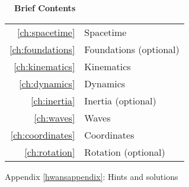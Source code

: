 \documentclass{sr}
\begin{document}


\cleardoublepage





\pagebreak\vspace{100mm}

\hbox{}\noindent\huge\bfseries\sffamily{}\hspace{-2mm}\ \ Brief Contents\\
\hspace{-20mm}\noindent\mynormaltype\Large\sffamily{}\begin{tabular}{rl}
\ref{ch:spacetime} & Spacetime \quad \pageref{ch:spacetime}\\
\ref{ch:foundations} & Foundations (optional) \quad \pageref{ch:foundations}\\
\ref{ch:kinematics} & Kinematics \quad \pageref{ch:kinematics}\\
\ref{ch:dynamics} & Dynamics \quad \pageref{ch:dynamics}\\
\ref{ch:inertia} & Inertia (optional) \quad \pageref{ch:inertia}\\
\ref{ch:waves} & Waves \quad \pageref{ch:waves}\\
\ref{ch:coordinates} & Coordinates \quad \pageref{ch:coordinates}\\
\ref{ch:rotation} & Rotation (optional) \quad \pageref{ch:rotation}\\
\end{tabular}
\mynormaltype

\vspace{100mm}\pagebreak

\cleardoublepage

\mynormaltype

\tableofcontents

{\sffamily{} Appendix \ref{hwansappendix}: Hints and solutions                      \dotfill \pageref{hwansappendix}}

\mainmatter
  \addtocounter{page}{8} 
\parafmt
\myeqnspacing %
	\renewcommand{\chapdir}{ch01}
	\renewcommand{\chapdir}{ch02}
	\renewcommand{\chapdir}{ch03}
	\renewcommand{\chapdir}{ch04}
	\renewcommand{\chapdir}{ch05}
	\renewcommand{\chapdir}{ch06}
	\renewcommand{\chapdir}{ch07}
	\formatchtoc{\large}{\quad\contentspage}{4mm} %
	\renewcommand{\chapdir}{ch08}
\end{document}
